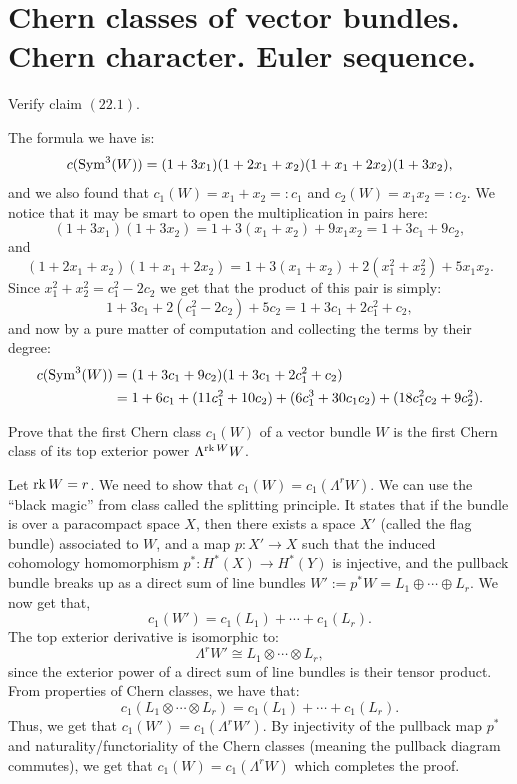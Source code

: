 \documentclass[11pt, a4paper]{article}
\begin{document}
\newpage

\section{Chern classes of vector bundles. Chern character. Euler sequence.}

\begin{exercise}
  Verify claim $(22.1)$.
\end{exercise}
\begin{solution}
  The formula we have is:
  \[
    c(\operatorname{Sym}^3(W)) = (1 + 3x_1)(1 + 2x_1 + x_2)(1 + x_1 + 2x_2)(1 + 3x_2),
  \]
  and we also found that $c_1(W) = x_1 + x_2 =: c_1$
  and $c_2(W) = x_1 x_2 =: c_2$.
  We notice that it may be smart to open the multiplication in pairs
  here:
  \[
    (1 + 3x_1)(1 + 3x_2) =
    1 + 3(x_1 + x_2) + 9 x_1 x_2 = 1 + 3c_1 + 9c_2,
  \]
  and
  \[
    (1 + 2x_1 + x_2)(1 + x_1 + 2x_2) =
    1 + 3(x_1 + x_2) + 2(x_1^2 + x_2^2) + 5 x_1 x_2.
  \]
  Since $x_1^2 + x_2^2 = c_1^2 - 2c_2$ we get that the product
  of this pair is simply:
  \[
    1 + 3c_1 + 2(c_1^2 - 2c_2) + 5c_2 = 1 + 3c_1 + 2c_1^2 + c_2,
  \]
  and now by a pure matter of computation and collecting the terms by
  their degree:
  \begin{align*}
    c(\operatorname{Sym}^3(W)) &=
    (1 + 3c_1 + 9c_2) (1 + 3c_1 + 2c_1^2 + c_2) \\ &=
    1 + 6c_1 + (11c_1^2 + 10c_2) + (6c_1^3 + 30c_1 c_2) + (18c_1^2c_2 + 9c_2^2).
  \end{align*}
\end{solution}

\begin{exercise}
  Prove that the first Chern class $c_1(W)$ of a vector bundle $W$ is the first
  Chern class of its top exterior power $\Lambda^{\operatorname{rk} W} W$.
\end{exercise}
\begin{solution}
  Let $\operatorname{rk} W = r$.
  We need to show that $c_1(W) = c_1(\Lambda^{r} W)$.
  We can use the ``black magic'' from class called the splitting principle.
  It states that if the bundle is over a paracompact space $X$,
  then there exists a space $X'$ (called the flag bundle) associated to $W$,
  and a map $p \colon X' \to X$ such that the induced cohomology homomorphism
  $p^* \colon H^*(X) \to H^*(Y)$ is injective, and the pullback bundle
  breaks up as a direct sum of line bundles
  $W' := p^*W = L_1 \oplus \cdots \oplus L_r$.
  We now get that,
  \[
    c_1(W') = c_1(L_1) + \cdots + c_1(L_r).
  \]
  The top exterior derivative is isomorphic to:
  \[
    \Lambda^{r} W' \cong L_1 \otimes \cdots \otimes L_r,
  \]
  since the exterior power of a direct sum of line bundles is their tensor
  product.
  From properties of Chern classes, we have that:
  \[
    c_1(L_1 \otimes \cdots \otimes L_r) = c_1(L_1) + \cdots + c_1(L_r).
  \]
  Thus, we get that $c_1(W') = c_1(\Lambda^{r} W')$.
  By injectivity of the pullback map $p^*$ and naturality/functoriality
  of the Chern classes (meaning the pullback diagram commutes), we get that
  $c_1(W) = c_1(\Lambda^{r} W)$ which completes the proof.
\end{solution}
\end{document}
